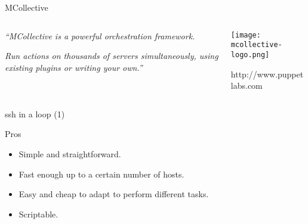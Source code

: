 \documentclass[presentation]{beamer}
\begin{document}
{
\begin{frame}[label=sec-7-1]{MCollective}

\begin{columns}
\begin{column}{0.6\textwidth}

\textit{``MCollective is a powerful orchestration framework.}

\textit{Run actions on thousands of servers simultaneously, using existing plugins or writing your own.''}
\end{column}

\begin{column}{0.4\textwidth}

\texttt{[image: mcollective-logo.png]}

\small{http://www.puppetlabs.com}
\end{column}
\end{columns}
\end{frame}} %


{
\begin{frame}[label=sec-7-2]{ssh in a loop (1)}

\begin{block}{Pros}

\begin{itemize}
\item Simple and straightforward.
\item Fast enough up to a certain number of hosts.
\item Easy and cheap to adapt to perform different tasks.
\item Scriptable.
\end{itemize}
\end{block}
\end{frame}} %
\end{document}
